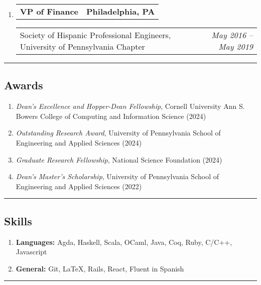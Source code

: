 \documentclass[letterpaper]{article}
\makeatletter
\newif\iflong
\newcommand*{\tabulardef}[3]{\begin{tabular}[t]{@{}lp{\dimexpr\linewidth-#1}@{}}
    #2&#3
\end{tabular}}
\newcommand{\headerrow}[2]
{\begin{tabular*}{\linewidth}{l@{\extracolsep{\fill}}r}
	#1 &
	#2 \\
\end{tabular*}}
\makeatother
\begin{document}
\begin{enumerate}[label=]
	\item
		\headerrow
			{\textbf{VP of Finance}}
			{\textbf{Philadelphia, PA}}
	\headerrow
		{Society of Hispanic Professional Engineers, University of Pennsylvania Chapter}
		{\emph{May 2016 -- May 2019}}
    \iflong
	\begin{enumerate}[label= *]
	\parskip=-0.1em
		\item\tabulardef{5cm}{}{Fundraise and organize bringing student members to the SHPE National Convention}
	\end{enumerate}
    \fi
\end{enumerate}
\hrule

\subsection*{Awards}
\begin{enumerate}[label=]
	\parskip=-0.25em
    \item \emph{Dean's Excellence and Hopper-Dean Fellowship}, Cornell University Ann S. Bowers College of Computing and Information Science (2024)
    \item \emph{Outstanding Research Award}, University of Pennsylvania School of Engineering and Applied Sciences (2024)
    \item \emph{Graduate Research Fellowship}, National Science Foundation (2024)
    \item \emph{Dean's Master's Scholarship}, University of Pennsylvania School of Engineering and Applied Sciences (2022)
\end{enumerate}
\hrule

\subsection*{Skills}
\begin{enumerate}[label=]
	\parskip=-0.25em

	\item
	\textbf{Languages: } Agda, Haskell, Scala, OCaml, Java, Coq, Ruby, C/C++, Javascript

	\item
	\textbf{General: } Git, \LaTeX, Rails, React, Fluent in Spanish

\end{enumerate}
\hrule
\end{document}
